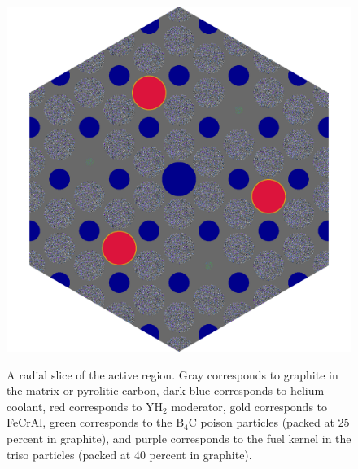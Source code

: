 \documentclass[letterpaper]{physor2024}
\begin{document}
\begin{figure}[h!]
    \centering
    \includegraphics[width=0.525\linewidth]{figures/active_height.png}
    \label{fig:active_slice}
    \caption{A radial slice of the active region. Gray corresponds to graphite in the matrix or pyrolitic carbon, dark blue corresponds to helium coolant, red corresponds to YH$_{2}$ moderator, gold corresponds to FeCrAl, green corresponds to the B$_{4}$C poison particles (packed at 25 percent in graphite), and purple corresponds to the fuel kernel in the \gls{triso} particles (packed at 40 percent in graphite).}
    \label{fig:core_slice_sbs}
\end{figure}
\end{document}
